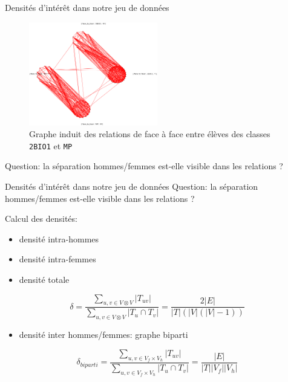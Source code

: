\documentclass[15pt]{beamer}
\begin{document}
\begin{frame}{Densités d'intérêt dans notre jeu de données}

    \begin{figure}
        \centering
        \includegraphics[width=0.5\textwidth]{img/sousmulticlasseftf.png}
        \caption{Graphe induit des relations de face à face entre élèves des classes \texttt{2BIO1} et \texttt{MP} }
        \label{fig:my_label}
    \end{figure}
    \pause
    Question: la séparation hommes/femmes est-elle \og visible \fg{} dans les relations ?
    
    
\end{frame}

\begin{frame}{Densités d'intérêt dans notre jeu de données}
    Question: la séparation hommes/femmes est-elle \og visible \fg{} dans les relations ?
    \pause
    
    Calcul des densités:
    \begin{itemize}
        \item densité intra-hommes
        \item densité intra-femmes
        \item densité totale
    \end{itemize}
    $$\delta = \frac{\sum_{u,v \in V\otimes V} |T_{uv}|}{\sum_{u,v \in V \otimes V}|T_u\cap T_v|} = \frac{2|E|}{|T|(|V|(|V|-1))}$$
    \pause
    \begin{itemize}
        \item densité inter hommes/femmes: graphe biparti
    \end{itemize}
    $$\delta_{biparti}=\frac{\sum_{u,v \in V_f \times V_h} |T_{uv}|}{\sum_{u,v \in V_f \times V_h}|T_u\cap T_v|}=\frac{|E|}{|T||V_f||V_h|}$$
\end{frame}
\end{document}
